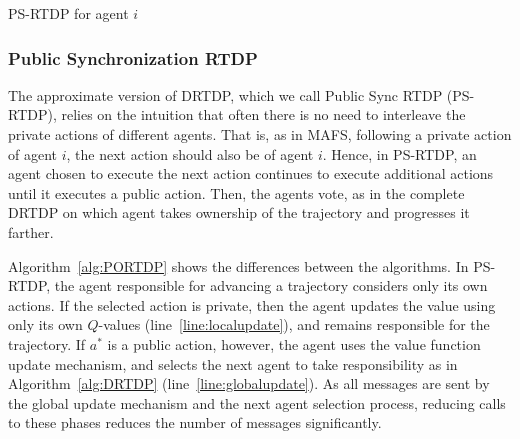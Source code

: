 \documentclass[letterpaper]{article} %
\theoremstyle{remark}
\begin{document}
\begin{algorithm}[t!]
\footnotesize
\caption{PS-RTDP for agent $i$}
\label{alg:PORTDP}

\end{algorithm}




\subsubsection{Public Synchronization RTDP}

The approximate version of DRTDP, which we call Public Sync RTDP (PS-RTDP), relies on the intuition that often there is no need to interleave the private actions of different agents. That is, as in MAFS, following a private action of agent $i$, the next action should also be of agent $i$.
Hence, in PS-RTDP, an agent chosen to execute the next action continues to execute additional actions until it executes a public action. Then, the agents vote, as in the complete DRTDP on which agent takes ownership of the trajectory and progresses it farther.

\vspace{-1.64mm}
\vspace{-3.28mm}
Algorithm~\ref{alg:PORTDP} shows the differences between the algorithms. In PS-RTDP, the agent responsible for advancing a trajectory considers only its own actions. If the selected action is private, then the agent updates the value using only its own $Q$-values (line~\ref{line:localupdate}), and remains responsible for the trajectory. If $a^*$ is a public action, however, the agent uses the value function update mechanism, and selects the next agent to take responsibility as in Algorithm~\ref{alg:DRTDP} (line~\ref{line:globalupdate}).  As all messages are sent by the global update mechanism and the next agent selection process, reducing calls to these phases reduces the number of messages significantly.
\end{document}
